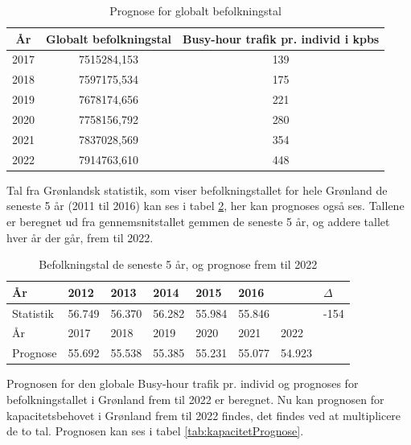 \begin{table}
	\centering
    \begin{tabular}{|c|c|c|}
    \hline
    År   & Globalt befolkningstal & Busy-hour trafik pr. individ i kpbs \\ \hline
    2017 & 7515284,153            & 139                          \\ \hline
    2018 & 7597175,534            & 175                          \\ \hline
    2019 & 7678174,656            & 221                          \\ \hline
    2020 & 7758156,792            & 280                          \\ \hline
    2021 & 7837028,569            & 354                          \\ \hline
    2022 & 7914763,610            & 448                          \\ \hline
    \end{tabular}
    \caption{Prognose for globalt befolkningstal}
    \label{tab:globalBefolkning}
\end{table}
Tal fra Grønlandsk statistik, som viser befolkningstallet for hele Grønland de seneste 5 år (2011 til 2016) kan ses i tabel \ref{tab:grlBefolkning}, her kan prognoses også ses. Tallene er beregnet ud fra gennemsnitstallet gemmen de seneste 5 år, og addere tallet hver år der går, frem til 2022.
\begin{table}
	\centering
    \begin{tabular}{|l|l|l|l|l|l|l|l|}
    \hline
    År        & 2012   & 2013   & 2014   & 2015   & 2016   & ~      & $\Delta$ \\ \hline
    Statistik & 56.749 & 56.370 & 56.282 & 55.984 & 55.846 & ~      & -154                \\ \hline
    År        & 2017   & 2018   & 2019   & 2020   & 2021   & 2022   & ~                   \\ \hline
    Prognose  & 55.692 & 55.538 & 55.385 & 55.231 & 55.077 & 54.923 & ~                   \\ \hline
    \end{tabular}
    \caption{Befolkningstal de seneste 5 år, og prognose frem til 2022}
    \label{tab:grlBefolkning}
\end{table}
Prognosen for den globale Busy-hour trafik pr. individ og prognoses for befolkningstallet i Grønland frem til 2022 er beregnet. Nu kan prognosen for kapacitetsbehovet i Grønland frem til 2022 findes, det findes ved at multiplicere de to tal. Prognosen kan ses i tabel \ref{tab:kapacitetPrognose}.
